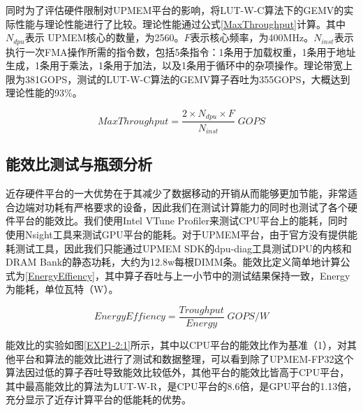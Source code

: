同时为了评估硬件限制对UPMEM平台的影响，将LUT-W-C算法下的GEMV的实际性能与理论性能进行了比较。理论性能通过公式\ref{MaxThroughput}计算。其中$N_{dpu}$表示 UPMEM核心的数量，为2560。$F$表示核心频率，为400MHz。$N_{inst}$表示执行一次FMA操作所需的指令数，包括5条指令：1条用于加载权重，1条用于地址生成，1条用于乘法，1条用于加法，以及1条用于循环中的杂项操作。理论带宽上限为381GOPS，测试的LUT-W-C算法的GEMV算子吞吐为355GOPS，大概达到理论性能的93\%。

\begin{equation}
    MaxThroughput=\frac{2\times N_{dpu}\times F}{N_{inst}}\; GOPS
    \label{MaxThroughput}
\end{equation}

\subsection{能效比测试与瓶颈分析}
近存硬件平台的一大优势在于其减少了数据移动的开销从而能够更加节能，非常适合边端对功耗有严格要求的设备，因此我们在测试计算能力的同时也测试了各个硬件平台的能效比。我们使用Intel VTune Profiler来测试CPU平台上的能耗，同时使用Nsight工具来测试GPU平台的能耗。对于UPMEM平台，由于官方没有提供能耗测试工具，因此我们只能通过UPMEM SDK的dpu-diag工具测试DPU的内核和DRAM Bank的静态功耗，大约为12.8w每根DIMM条。能效比定义简单地计算公式为\ref{EnergyEffiency}，其中算子吞吐与上一小节中的测试结果保持一致，Energy为能耗，单位瓦特（W）。

\begin{equation}
    EnergyEffiency=\frac{Troughput}{Energy}\; GOPS/W
    \label{EnergyEffiency}
\end{equation}

能效比的实验如图\ref{EXP1-2:1}所示，其中以CPU平台的能效比作为基准（1），对其他平台和算法的能效比进行了测试和数据整理，可以看到除了UPMEM-FP32这个算法因过低的算子吞吐导致能效比较低外，其他平台的能效比皆高于CPU平台，其中最高能效比的算法为LUT-W-R，是CPU平台的8.6倍，是GPU平台的1.13倍，充分显示了近存计算平台的低能耗的优势。

